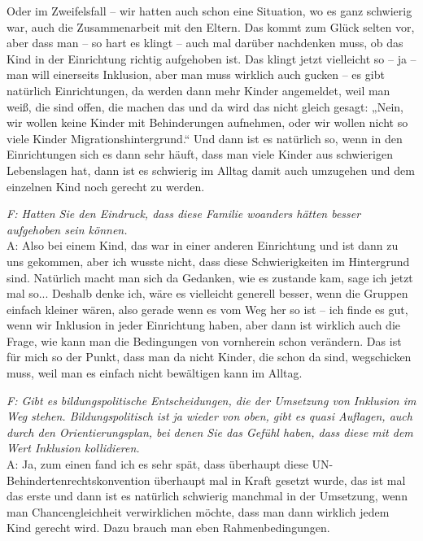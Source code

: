 \begin{linenumbers*}
Oder im Zweifelsfall – wir hatten auch schon eine Situation, wo es ganz schwierig war, auch die Zusammenarbeit mit den Eltern. Das kommt zum Glück selten vor, aber dass man – so hart es klingt – auch mal darüber nachdenken muss, ob das Kind in der Einrichtung richtig aufgehoben ist. Das klingt jetzt vielleicht so -- ja – man will einerseits Inklusion, aber man muss wirklich auch gucken – es gibt natürlich Einrichtungen, da werden dann mehr Kinder angemeldet, weil man weiß, die sind offen, die machen das und da wird das nicht gleich gesagt: „Nein, wir wollen keine Kinder mit Behinderungen aufnehmen, oder wir wollen nicht so viele Kinder Migrationshintergrund.“ Und dann ist es natürlich so, wenn in den Einrichtungen sich es dann sehr häuft, dass man viele Kinder aus schwierigen Lebenslagen hat, dann ist es schwierig im Alltag damit auch umzugehen und dem einzelnen Kind noch gerecht zu werden.  

\emph{F: Hatten Sie den Eindruck, dass diese Familie woanders hätten besser aufgehoben sein können.}\\
A: Also bei einem Kind, das war in einer anderen Einrichtung und ist dann zu uns gekommen, aber ich wusste nicht, dass diese Schwierigkeiten im Hintergrund sind. Natürlich macht man sich da Gedanken, wie es zustande kam, sage ich jetzt mal so... Deshalb denke ich, wäre es vielleicht generell besser, wenn die Gruppen einfach kleiner wären, also gerade wenn es vom Weg her so ist -- ich finde es gut, wenn wir Inklusion in jeder Einrichtung haben, aber dann ist wirklich auch die Frage, wie kann man die Bedingungen von vornherein schon verändern. Das ist für mich so der Punkt, dass man da nicht Kinder, die schon da sind, wegschicken muss, weil man es einfach nicht bewältigen kann im Alltag. 

\emph{F: Gibt es bildungspolitische Entscheidungen, die der Umsetzung von Inklusion im Weg stehen. Bildungspolitisch ist ja wieder von oben, gibt es quasi Auflagen, auch durch den Orientierungsplan, bei denen Sie das Gefühl haben, dass diese mit dem Wert Inklusion kollidieren.}\\
A: Ja, zum einen fand ich es sehr spät, dass überhaupt diese UN-Behindertenrechtskonvention überhaupt mal in Kraft gesetzt wurde, das ist mal das erste und dann ist es natürlich schwierig manchmal in der Umsetzung, wenn man Chancengleichheit verwirklichen möchte, dass man dann wirklich jedem Kind gerecht wird. Dazu brauch man eben Rahmenbedingungen.   


\end{linenumbers*}
